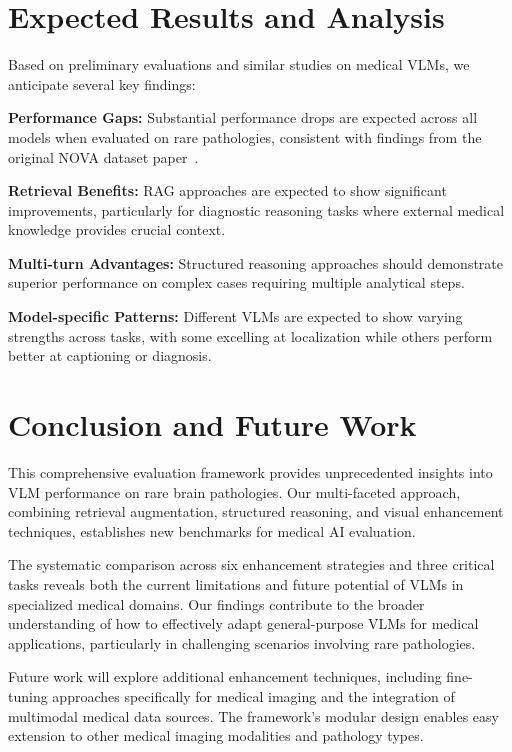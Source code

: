 \documentclass[runningheads]{llncs}
\begin{document}
\section{Expected Results and Analysis}

Based on preliminary evaluations and similar studies on medical VLMs, we anticipate several key findings:

\textbf{Performance Gaps:} Substantial performance drops are expected across all models when evaluated on rare pathologies, consistent with findings from the original NOVA dataset paper~\cite{nova2024}.

\textbf{Retrieval Benefits:} RAG approaches are expected to show significant improvements, particularly for diagnostic reasoning tasks where external medical knowledge provides crucial context.

\textbf{Multi-turn Advantages:} Structured reasoning approaches should demonstrate superior performance on complex cases requiring multiple analytical steps.

\textbf{Model-specific Patterns:} Different VLMs are expected to show varying strengths across tasks, with some excelling at localization while others perform better at captioning or diagnosis.

\section{Conclusion and Future Work}

This comprehensive evaluation framework provides unprecedented insights into VLM performance on rare brain pathologies. Our multi-faceted approach, combining retrieval augmentation, structured reasoning, and visual enhancement techniques, establishes new benchmarks for medical AI evaluation.

The systematic comparison across six enhancement strategies and three critical tasks reveals both the current limitations and future potential of VLMs in specialized medical domains. Our findings contribute to the broader understanding of how to effectively adapt general-purpose VLMs for medical applications, particularly in challenging scenarios involving rare pathologies.

Future work will explore additional enhancement techniques, including fine-tuning approaches specifically for medical imaging and the integration of multimodal medical data sources. The framework's modular design enables easy extension to other medical imaging modalities and pathology types.
\end{document}
